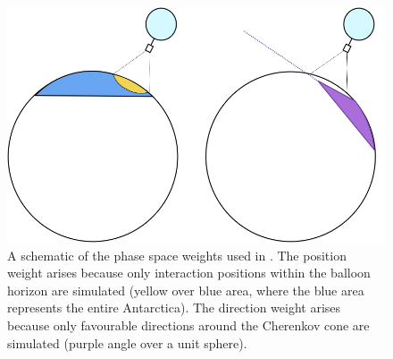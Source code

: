 

\begin{figure}[!h]\centering
  \includegraphics[width=.8\linewidth, trim = 0 6.5cm 0 0, clip]{./Figs/icemcWeightScheme.png}
  \caption{A schematic of the phase space weights used in \icemc. The
    position weight arises because only interaction positions within
    the balloon horizon are simulated (yellow over blue area, where
    the blue area represents the entire Antarctica).
  The direction weight arises because only favourable directions around the
  Cherenkov cone are simulated (purple angle over a unit sphere).}
  \label{fig:weights}
\end{figure}
